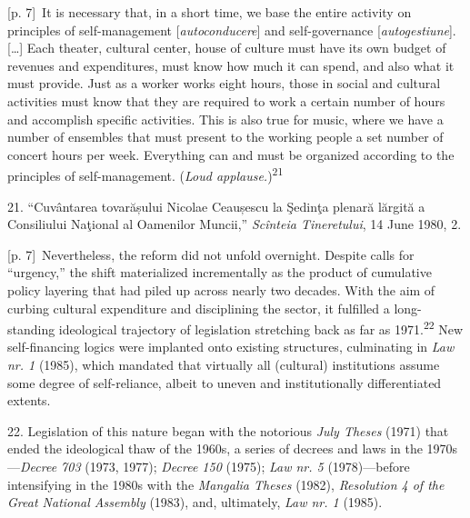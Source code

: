 \documentclass[10pt,a4paper]{article}
\begin{document}
{\scriptsize\color{gray} [p. 7]}\ It is necessary that, in a short time, we base the entire activity on principles of self-management [\textit{autoconducere}] and self-governance [\textit{autogestiune}]. […] Each theater, cultural center, house of culture must have its own budget of revenues and expenditures, must know how much it can spend, and also what it must provide. Just as a worker works eight hours, those in social and cultural activities must know that they are required to work a certain number of hours and accomplish specific activities. This is also true for music, where we have a number of ensembles that must present to the working people a set number of concert hours per week. Everything can and must be organized according to the principles of self-management. (\textit{Loud applause.})\nobreak\textsuperscript{21}\par{\small 21. “Cuvântarea tovarășului Nicolae Ceaușescu la Şedinţa plenară lărgită a Consiliului Naţional al Oamenilor Muncii,” \textit{Scînteia Tineretului}, 14 June 1980, 2.\par}
{\scriptsize\color{gray} [p. 7]}\ Nevertheless, the reform did not unfold overnight. Despite calls for “urgency,” the shift materialized incrementally as the product of cumulative policy layering that had piled up across nearly two decades. With the aim of curbing cultural expenditure and disciplining the sector, it fulfilled a long-standing ideological trajectory of legislation stretching back as far as 1971.\nobreak\textsuperscript{22} New self-financing logics were implanted onto existing structures, culminating in \textit{Law nr. 1} (1985), which mandated that virtually all (cultural) institutions assume some degree of self-reliance, albeit to uneven and institutionally differentiated extents.\par{\small 22. Legislation of this nature began with the notorious \textit{July Theses} (1971) that ended the ideological thaw of the 1960s, a series of decrees and laws in the 1970s—\textit{Decree 703} (1973, 1977); \textit{Decree 150} (1975); \textit{Law nr. 5} (1978)—before intensifying in the 1980s with the \textit{Mangalia Theses} (1982), \textit{Resolution 4 of the Great National Assembly} (1983), and, ultimately, \textit{Law nr. 1} (1985).\par}
\end{document}
